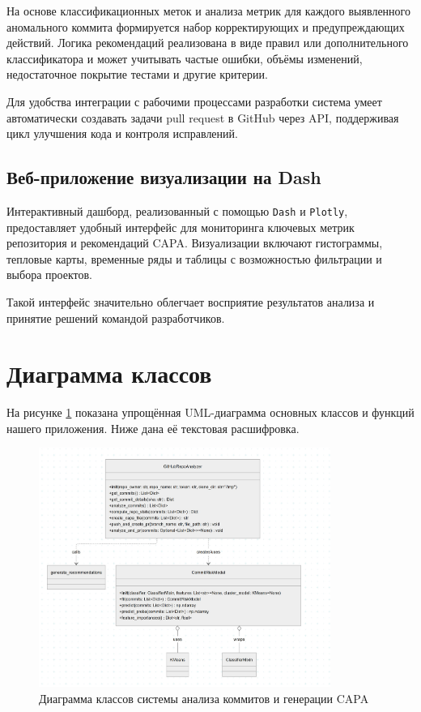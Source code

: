 На основе классификационных меток и анализа метрик для каждого выявленного аномального коммита формируется набор корректирующих и предупреждающих действий. Логика рекомендаций реализована в виде правил или дополнительного классификатора и может учитывать частые ошибки, объёмы изменений, недостаточное покрытие тестами и другие критерии.

Для удобства интеграции с рабочими процессами разработки система умеет автоматически создавать задачи pull request в GitHub через API, поддерживая цикл улучшения кода и контроля исправлений.

\subsection{Веб-приложение визуализации на Dash}

Интерактивный дашборд, реализованный с помощью \texttt{Dash} и \texttt{Plotly}, предоставляет удобный интерфейс для мониторинга ключевых метрик репозитория и рекомендаций CAPA. Визуализации включают гистограммы, тепловые карты, временные ряды и таблицы с возможностью фильтрации и выбора проектов.

Такой интерфейс значительно облегчает восприятие результатов анализа и принятие решений командой разработчиков.

\section{Диаграмма классов} \label{ch2:sec5}

На рисунке \ref{fig:class-diagram} показана упрощённая UML-диаграмма основных классов и функций нашего приложения. Ниже дана её текстовая расшифровка.

\begin{figure}[ht]
	\centering
	\includegraphics[width=0.85\textwidth]{my_folder/images/classDiagram.jpg}
	\caption{Диаграмма классов системы анализа коммитов и генерации CAPA}
	\label{fig:class-diagram}
\end{figure}

